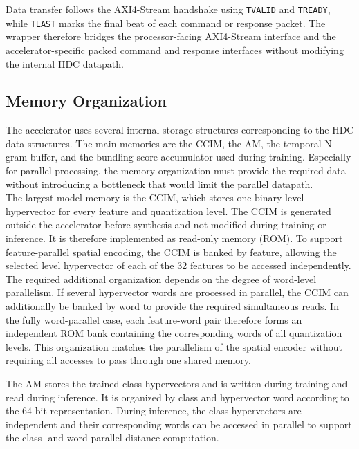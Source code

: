 Data transfer follows the AXI4-Stream handshake using \texttt{TVALID} and \texttt{TREADY}, while \texttt{TLAST} marks the final beat of each command or response packet. The wrapper therefore bridges the processor-facing AXI4-Stream interface and the accelerator-specific packed command and response interfaces without modifying the internal HDC datapath.




\subsection{Memory Organization}
\label{sec:accelerator_memory}

The accelerator uses several internal storage structures corresponding to the HDC data structures. The main memories are the CCIM, the AM, the temporal N-gram buffer, and the bundling-score accumulator used during training. Especially for parallel processing, the memory organization must provide the required data without introducing a bottleneck that would limit the parallel datapath.\\

The largest model memory is the CCIM, which stores one binary level hypervector for every feature and quantization level. The CCIM is generated outside the accelerator before synthesis and not modified during training or inference. It is therefore implemented as read-only memory (ROM). To support feature-parallel spatial encoding, the CCIM is banked by feature, allowing the selected level hypervector of each of the 32 features to be accessed independently. The required additional organization depends on the degree of word-level parallelism. If several hypervector words are processed in parallel, the CCIM can additionally be banked by word to provide the required simultaneous reads. In the fully word-parallel case, each feature-word pair therefore forms an independent ROM bank containing the corresponding words of all quantization levels. This organization matches the parallelism of the spatial encoder without requiring all accesses to pass through one shared memory.

The AM stores the trained class hypervectors and is written during training and read during inference. It is organized by class and hypervector word according to the 64-bit representation. During inference, the class hypervectors are independent and their corresponding words can be accessed in parallel to support the class- and word-parallel distance computation.

